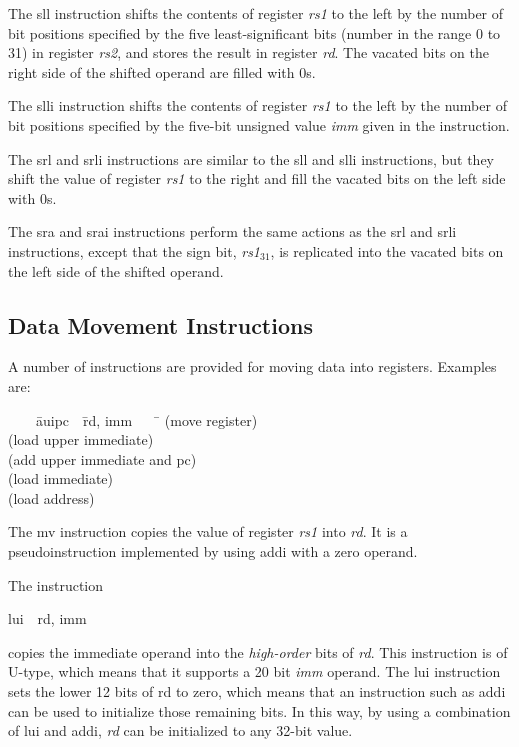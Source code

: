 \documentclass[11pt, twoside, pdftex]{article}
\newenvironment{ctabbing}%
{\begin{center}\begin{minipage}{\textwidth}\begin{tabbing}}
{\end{tabbing}\end{minipage}\end{center}}
\begin{document}
\noindent
The {\sf sll} instruction shifts the contents of register {\it rs1} to the left by the number 
of bit positions specified by the five least-significant bits (number in the range 0 to 31)
in register {\it rs2}, and stores the result in register {\it rd}. The vacated bits on the
right side of the shifted operand are filled with 0s.

\noindent
The {\sf slli} instruction shifts the contents of register {\it rs1} to the left by the number 
of bit positions specified by the five-bit unsigned value {\it imm} given in the instruction.

\noindent
The {\sf srl} and {\sf srli} instructions are similar to the {\sf sll} and {\sf slli}
instructions, but they shift the value of register {\it rs1} to the right and fill the vacated
bits on the left side with 0s.

\noindent
The {\sf sra} and {\sf srai} instructions perform the same actions as the {\sf srl} and 
{\sf srli} instructions, except that the sign bit, {\it rs1}$_{31}$, is replicated into 
the vacated bits on the left side of the shifted operand.

\subsection{Data Movement Instructions}

A number of instructions are provided for moving data into registers. Examples are:

\vspace{-\baselineskip}
\begin{ctabbing}
~~~~\={\sf auipc}~~\={\sf rd, imm}~~~~\=\kill
{}  \>(move register)\\
  \>(load upper immediate)\\
  \>(add upper immediate and pc)\\
  \>(load immediate)\\
  \>(load address)\\
\end{ctabbing}
\vspace{-\baselineskip}
The {\sf mv} instruction copies the value of register {\it rs1} into {\it rd}.
It is a pseudoinstruction implemented by using {\sf addi} with a zero operand.

The instruction
\vspace{-\baselineskip}
\begin{center}
{\sf lui~~rd, imm}
\end{center}
\noindent
copies the immediate operand into the {\it high-order} bits of {\it rd}. This instruction
is of U-type, which means that it supports a 20 bit {\it imm} operand. The {\sf lui}
instruction sets the lower 12 bits of rd to zero, which means that an instruction such as
{\sf addi} can be used to initialize those remaining bits. In this way, by using a combination 
of {\sf lui} and {\sf addi}, {\it rd} can be initialized to any 32-bit value. 
\end{document}
